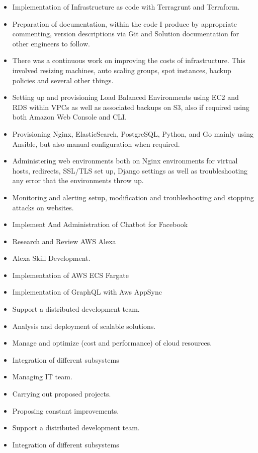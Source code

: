 \divider

\begin{itemize}
    \item Implementation of Infrastructure as code with Terragrunt and Terraform.
    \item Preparation of documentation, within the code I produce by appropriate commenting, version descriptions via Git and Solution documentation for other engineers to follow.
    \item There was a continuous work on improving the costs of infrastructure. This involved resizing machines, auto scaling groups, spot instances, backup policies and several other things.
    \item Setting up and provisioning Load Balanced Environments using EC2 and RDS within VPCs as well as associated backups on S3, also if required using both Amazon Web Console and CLI.
    \item Provisioning Nginx, ElasticSearch, PostgreSQL, Python, and Go mainly using Ansible, but also manual configuration when required.
    \item Administering web environments both on Nginx environments for virtual hosts, redirects, SSL/TLS set up, Django settings as well as troubleshooting any error that the environments throw up.
    \item Monitoring and alerting setup, modification and troubleshooting and stopping attacks on websites.
    \item Implement And Administration of Chatbot for Facebook
    \item Research and Review AWS Alexa
    \item Alexa Skill Development.
    \item Implementation of AWS ECS Fargate
    \item Implementation of GraphQL with Aws AppSync
\end{itemize}

\divider

\begin{itemize}
    \item Support a distributed development team.
    \item Analysis and deployment of scalable solutions.
    \item Manage and optimize (cost and performance) of cloud resources.
    \item Integration of different subsystems
    \item Managing IT team.
    \item Carrying out proposed projects.
    \item Proposing constant improvements.
    \item Support a distributed development team.
    \item Integration of different subsystems
\end{itemize}

